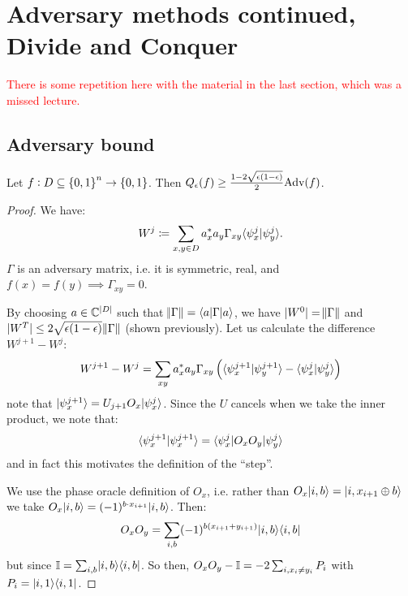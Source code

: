 \section{Adversary methods continued, Divide and Conquer}
\textcolor{red}{There is some repetition here with the material in the last section, which was a missed lecture.}
\subsection*{Adversary bound}
\begin{propbox}{}
    Let $f: D \subseteq \set{0, 1}^n \to \set{0, 1}$. Then $Q_\epsilon(f) \geq \frac{1-2\sqrt{\epsilon(1-\epsilon)}}{2}\text{Adv}(f)$.
\end{propbox}
\begin{proof}
    We have:
    \begin{equation}
        W^j \coloneqq \sum_{x, y \in D}a_x^*a_y\Gamma_{xy}\langle \psi^j_x \lvert \psi^j_y \rangle.
    \end{equation}
    $\Gamma$ is an adversary matrix, i.e. it is symmetric, real, and $f(x) = f(y) \implies \Gamma_{xy} = 0$. 

    By choosing $a \in \mathbb{C}^{\lvert D \rvert}$ such that $\norm{\Gamma} = \langle a \rvert\Gamma\lvert a \rangle$, we have $\lvert W^0 \rvert = \norm{\Gamma}$ and $\lvert W^T \rvert \leq 2\sqrt{\epsilon(1-\epsilon)}\norm{\Gamma}$ (shown previously). Let us calculate the difference $W^{j+1}-W^j$:
    \begin{equation}
        W^{j+1}-W^j = \sum_{xy}a_x^*a_y\Gamma_{xy}\left(\langle \psi_x^{j+1} \lvert \psi_y^{j+1} \rangle - \langle \psi_x^j \lvert \psi_y^j \rangle\right)
    \end{equation}
    note that $\lvert \psi_x^{j+1} \rangle = U_{j+1}O_x\lvert \psi_x^j \rangle$. Since the $U$ cancels when we take the inner product, we note that:
    \begin{equation}
        \langle \psi_x^{j+1} \lvert \psi_x^{j+1} \rangle = \langle \psi_x^j \rvert O_xO_y\lvert \psi_y^j \rangle
    \end{equation}
    and in fact this motivates the definition of the ``step''.

    We use the phase oracle definition of $O_x$, i.e. rather than $O_x\lvert i, b \rangle = \lvert i, x_{i+1} \oplus b \rangle$ we take $O_x\lvert i, b \rangle = (-1)^{b \cdot x_{i+1}}\lvert i, b \rangle$. Then:
    \begin{equation}
        O_xO_y = \sum_{i, b}(-1)^{b(x_{i+1} + y_{i+1})}\lvert i, b \rangle \langle i, b \rvert
    \end{equation}
    but since $\mathbb{I} = \sum_{i, b}\lvert i, b \rangle \langle i, b \rvert$. So then, $O_xO_y - \mathbb{I} = -2\sum_{i, x_i \neq y_i} P_i$ with $P_i = \lvert i, 1 \rangle \langle i, 1 \rvert$. 


\end{proof}
